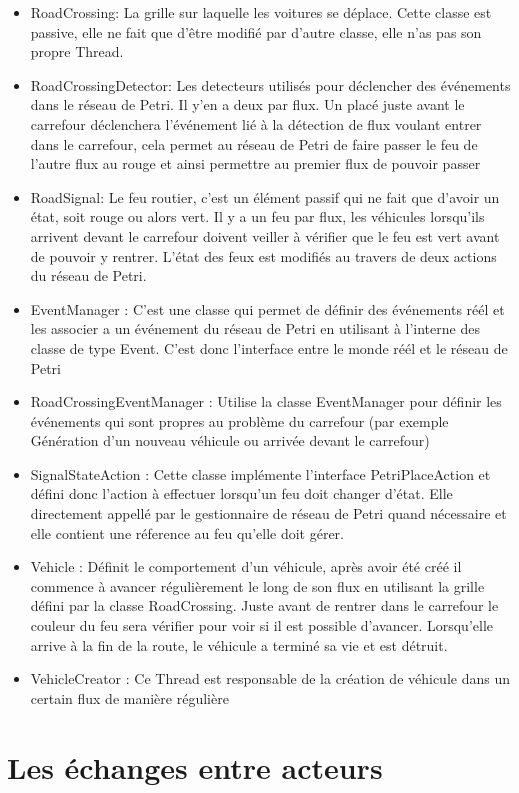 \documentclass[11pt,a4paper, openany]{memoir}
\begin{document}
\begin{itemize}
\item RoadCrossing: La grille sur laquelle les voitures se déplace. Cette classe est passive, elle ne fait que d'être modifié par d'autre classe, elle n'as pas son propre Thread.
\item RoadCrossingDetector: Les detecteurs utilisés pour déclencher des événements dans le réseau de Petri. Il y'en a deux par flux. Un placé juste avant le carrefour déclenchera l'événement lié à la détection de flux voulant entrer dans le carrefour, cela permet au réseau de Petri de faire passer le feu de l'autre flux au rouge et ainsi permettre au premier flux de pouvoir passer
\item RoadSignal: Le feu routier, c'est un élément passif qui ne fait que d'avoir un état, soit rouge ou alors vert. Il y a un feu par flux, les véhicules lorsqu'ils arrivent devant le carrefour doivent veiller à vérifier que le feu est vert avant de pouvoir y rentrer. L'état des feux est modifiés au travers de deux actions du réseau de Petri.
\item EventManager : C'est une classe qui permet de définir des événements réél et les associer a un événement du réseau de Petri en utilisant à l'interne des classe de type Event. C'est donc l'interface entre le monde réél et le réseau de Petri
\item RoadCrossingEventManager : Utilise la classe EventManager pour définir les événements qui sont propres au problème du carrefour (par exemple Génération d'un nouveau véhicule ou arrivée devant le carrefour)
\item SignalStateAction : Cette classe implémente l'interface PetriPlaceAction et défini donc l'action à effectuer lorsqu'un feu doit changer d'état. Elle directement appellé par le gestionnaire de réseau de Petri quand nécessaire et elle contient une réference au feu qu'elle doit gérer.
\item Vehicle : Définit le comportement d'un véhicule, après avoir été créé il commence à avancer régulièrement le long de son flux en utilisant la grille défini par la classe RoadCrossing. Juste avant de rentrer dans le carrefour le couleur du feu sera vérifier pour voir si il est possible d'avancer. Lorsqu'elle arrive à la fin de la route, le véhicule a terminé sa vie et est détruit.
\item VehicleCreator : Ce Thread est responsable de la création de véhicule dans un certain flux de manière régulière
\end{itemize}

\chapter{Les échanges entre acteurs}




%
\end{document}
